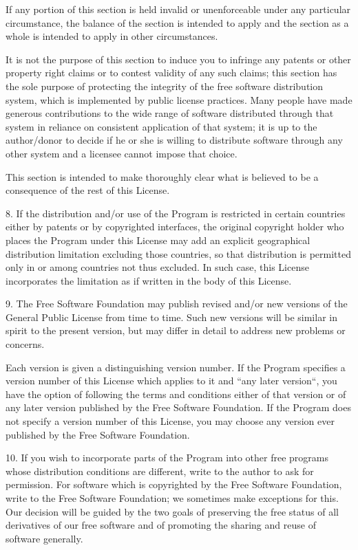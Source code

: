\documentclass[a4paper, 11pt, twoside]{article}
\begin{document}
If any portion of this section is held invalid or unenforceable under any particular circumstance, the balance of the section is intended to apply and the section as a whole is intended to apply in other circumstances.

It is not the purpose of this section to induce you to infringe any patents or other property right claims or to contest validity of any such claims; this section has the sole purpose of protecting the integrity of the free software distribution system, which is implemented by public license practices. Many people have made generous contributions to the wide range of software distributed through that system in reliance on consistent application of that system; it is up to the author/donor to decide if he or she is willing to distribute software through any other system and a licensee cannot impose that choice.

This section is intended to make thoroughly clear what is believed to be a consequence of the rest of this License.

8. If the distribution and/or use of the Program is restricted in certain countries either by patents or by copyrighted interfaces, the original copyright holder who places the Program under this License may add an explicit geographical distribution limitation excluding those countries, so that distribution is permitted only in or among countries not thus excluded. In such case, this License incorporates the limitation as if written in the body of this License.

9. The Free Software Foundation may publish revised and/or new versions of the General Public License from time to time. Such new versions will be similar in spirit to the present version, but may differ in detail to address new problems or concerns.

Each version is given a distinguishing version number. If the Program specifies a version number of this License which applies to it and “any later version“, you have the option of following the terms and conditions either of that version or of any later version published by the Free Software Foundation. If the Program does not specify a version number of this License, you may choose any version ever published by the Free Software Foundation.

10. If you wish to incorporate parts of the Program into other free programs whose distribution conditions are different, write to the author to ask for permission. For software which is copyrighted by the Free Software Foundation, write to the Free Software Foundation; we sometimes make exceptions for this. Our decision will be guided by the two goals of preserving the free status of all derivatives of our free software and of promoting the sharing and reuse of software generally.
\end{document}
